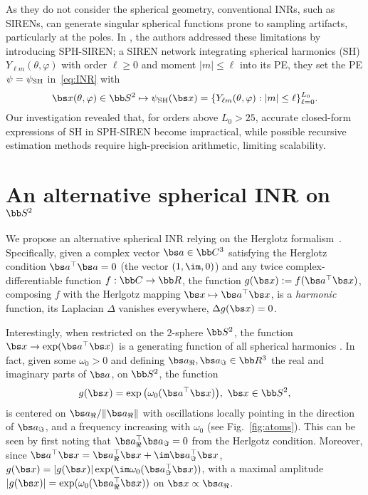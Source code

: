 \documentclass[conference]{IEEEtran}
\begin{document}
As they do not consider the spherical geometry, conventional INRs, such as SIRENs, can generate singular spherical functions prone to sampling artifacts, particularly at the poles. In \cite{russwurm2024locationencoding}, the authors addressed these limitations by introducing SPH-SIREN; a SIREN network integrating spherical harmonics (SH) $Y_{\ell m}(\theta,\varphi)$ with order $\ell \geq 0$ and moment $|m|\leq \ell$ \cite{courant62} into its PE, \ie they set the PE $\psi = \psi_{\rm SH}$ in~\eqref{eq:INR} with
\begin{equation*}
\bs x(\theta, \varphi)\in \bb S^2 \mapsto \psi_{\rm SH}(\bs x) = \{ {Y}_{\ell m}(\theta, \varphi) : |m|\leq \ell\}_{\ell=0}^{L_0}.
\end{equation*}
Our investigation revealed that, for orders above $L_0>25$, accurate closed-form expressions of SH in SPH-SIREN become impractical, while possible recursive estimation methods require high-precision arithmetic, limiting scalability.
\section{An alternative spherical INR on \(\bb S^2\)}
\label{sec:inr_S2}

We propose an alternative spherical INR relying on the Herglotz formalism~\cite[Sec. VII.7]{courant62}. Specifically, given a complex vector $\bs a \in \bb C^3$ satisfying the Herglotz condition $\bs a^\top \bs a =0$ (\eg the vector $(1,\im,0)$) and any twice complex-differentiable function $f: \bb C \to \bb R$, the function $g(\bs x) := f(\bs a^\top \bs x)$, composing $f$ with the Herlgotz mapping $\bs x \mapsto \bs a^\top\bs x$, is a \emph{harmonic} function, \ie its Laplacian $\Delta$ vanishes everywhere, $\Delta g(\bs x) = 0$. 

Interestingly, when restricted on the 2-sphere $\bb S^2$, the function 
$\bs x \to \exp(\bs a^\top\bs x)$
is a generating function of all spherical harmonics \cite{courant62}. In fact, given some $\omega_0 > 0$ and defining $\bs a_{\Re}, \bs a_{\Im} \in \bb R^3$ the real and imaginary parts of $\bs a$, on $\bb S^2$, the function 
\begin{equation}
\label{eq:Herglotz_mapping}
g(\bs x) = \exp\big(\omega_0 (\bs a^\top\bs x)\big),\ \bs x \in \bb S^2,
\end{equation}
is centered on $\bs a_{\Re}/\|\bs a_{\Re}\|$ with oscillations locally pointing in the direction of $\bs a_{\Im}$, and a frequency increasing with $\omega_0$ (see Fig.~\ref{fig:atoms}). This can be seen by first noting that $\bs a_{\Re}^\top\bs a_{\Im} = 0$ from the Herlgotz condition. Moreover, since $\bs a^\top\bs x = \bs a_{\Re}^\top \bs x + \im \bs a_{\Im}^\top\bs x$, $g(\bs x) = |g(\bs x)| \exp( \im \omega_0 (\bs a_{\Im}^\top\bs x))$, with a maximal amplitude $|g(\bs x)|=\exp( \omega_0 (\bs a_{\Re}^\top \bs x))$ on $\bs x \propto \bs a_{\Re}$. 
\end{document}
